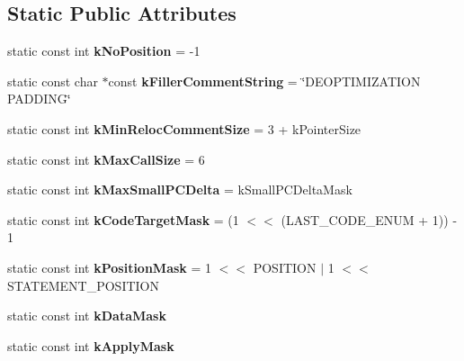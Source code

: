 \subsection*{Static Public Attributes}
\begin{DoxyCompactItemize}
\item 
\hypertarget{classv8_1_1internal_1_1_reloc_info_af18236bde80b2776cb8e62e565053a89}{}static const int {\bfseries k\+No\+Position} = -\/1\label{classv8_1_1internal_1_1_reloc_info_af18236bde80b2776cb8e62e565053a89}

\item 
\hypertarget{classv8_1_1internal_1_1_reloc_info_a5dca3a70ad12924b3a1d6a42c3b03a98}{}static const char $\ast$const {\bfseries k\+Filler\+Comment\+String} = \char`\"{}D\+E\+O\+P\+T\+I\+M\+I\+Z\+A\+T\+I\+O\+N P\+A\+D\+D\+I\+N\+G\char`\"{}\label{classv8_1_1internal_1_1_reloc_info_a5dca3a70ad12924b3a1d6a42c3b03a98}

\item 
\hypertarget{classv8_1_1internal_1_1_reloc_info_ac4fb63784119fabde3751f74a4c6317c}{}static const int {\bfseries k\+Min\+Reloc\+Comment\+Size} = 3 + k\+Pointer\+Size\label{classv8_1_1internal_1_1_reloc_info_ac4fb63784119fabde3751f74a4c6317c}

\item 
\hypertarget{classv8_1_1internal_1_1_reloc_info_a67b0b843b7077292ca5e49d94470c54b}{}static const int {\bfseries k\+Max\+Call\+Size} = 6\label{classv8_1_1internal_1_1_reloc_info_a67b0b843b7077292ca5e49d94470c54b}

\item 
\hypertarget{classv8_1_1internal_1_1_reloc_info_aaa24612c6d9accc00a457efc88180136}{}static const int {\bfseries k\+Max\+Small\+P\+C\+Delta} = k\+Small\+P\+C\+Delta\+Mask\label{classv8_1_1internal_1_1_reloc_info_aaa24612c6d9accc00a457efc88180136}

\item 
\hypertarget{classv8_1_1internal_1_1_reloc_info_a0193c4195c5b1dce42953210d9ec6dd4}{}static const int {\bfseries k\+Code\+Target\+Mask} = (1 $<$$<$ (L\+A\+S\+T\+\_\+\+C\+O\+D\+E\+\_\+\+E\+N\+U\+M + 1)) -\/ 1\label{classv8_1_1internal_1_1_reloc_info_a0193c4195c5b1dce42953210d9ec6dd4}

\item 
\hypertarget{classv8_1_1internal_1_1_reloc_info_a0ddf7d06f2fe51a53769262eb9529b6d}{}static const int {\bfseries k\+Position\+Mask} = 1 $<$$<$ P\+O\+S\+I\+T\+I\+O\+N $\vert$ 1 $<$$<$ S\+T\+A\+T\+E\+M\+E\+N\+T\+\_\+\+P\+O\+S\+I\+T\+I\+O\+N\label{classv8_1_1internal_1_1_reloc_info_a0ddf7d06f2fe51a53769262eb9529b6d}

\item 
static const int {\bfseries k\+Data\+Mask}
\item 
\hypertarget{classv8_1_1internal_1_1_reloc_info_a3674f1738fbd7b36d670397d0fbd363e}{}static const int {\bfseries k\+Apply\+Mask}\label{classv8_1_1internal_1_1_reloc_info_a3674f1738fbd7b36d670397d0fbd363e}

\end{DoxyCompactItemize}
